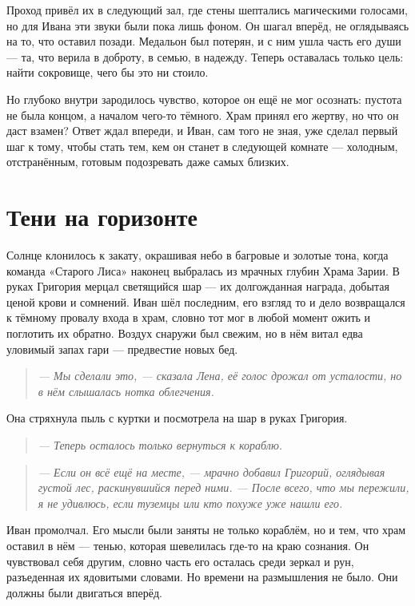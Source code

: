 \documentclass[12pt,a4paper]{book} %
\newenvironment{dialogue}{\begin{quote}\itshape}{\end{quote}}
\begin{document}
Проход привёл их в следующий зал, где стены шептались магическими голосами, но для Ивана эти звуки были пока лишь фоном. Он шагал вперёд, не оглядываясь на то, что оставил позади. Медальон был потерян, и с ним ушла часть его души --- та, что верила в доброту, в семью, в надежду. Теперь оставалась только цель: найти сокровище, чего бы это ни стоило.

Но глубоко внутри зародилось чувство, которое он ещё не мог осознать: пустота не была концом, а началом чего-то тёмного. Храм принял его жертву, но что он даст взамен? Ответ ждал впереди, и Иван, сам того не зная, уже сделал первый шаг к тому, чтобы стать тем, кем он станет в следующей комнате --- холодным, отстранённым, готовым подозревать даже самых близких.

\chapter{Тени на горизонте}

Солнце клонилось к закату, окрашивая небо в багровые и золотые тона, когда команда «Старого Лиса» наконец выбралась из мрачных глубин Храма Зарии. В руках Григория мерцал светящийся шар --- их долгожданная награда, добытая ценой крови и сомнений. Иван шёл последним, его взгляд то и дело возвращался к тёмному провалу входа в храм, словно тот мог в любой момент ожить и поглотить их обратно. Воздух снаружи был свежим, но в нём витал едва уловимый запах гари --- предвестие новых бед.

\begin{dialogue}
--- Мы сделали это, --- сказала Лена, её голос дрожал от усталости, но в нём слышалась нотка облегчения.
\end{dialogue}

Она стряхнула пыль с куртки и посмотрела на шар в руках Григория.

\begin{dialogue}
--- Теперь осталось только вернуться к кораблю.
\end{dialogue}

\begin{dialogue}
--- Если он всё ещё на месте, --- мрачно добавил Григорий, оглядывая густой лес, раскинувшийся перед ними. --- После всего, что мы пережили, я не удивлюсь, если туземцы или кто похуже уже нашли его.
\end{dialogue}

Иван промолчал. Его мысли были заняты не только кораблём, но и тем, что храм оставил в нём --- тенью, которая шевелилась где-то на краю сознания. Он чувствовал себя другим, словно часть его осталась среди зеркал и рун, разъеденная их ядовитыми словами. Но времени на размышления не было. Они должны были двигаться вперёд.
\end{document}
